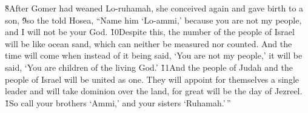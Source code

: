 \v{8}After Gomer had weaned Lo-ruhamah, she conceived again and gave birth to a son, \v{9}so the  told Hosea, ``Name him `Lo-ammi,' because you are not my people, and I will not be your God. \v{10}Despite this, the number of the people of Israel will be like ocean sand, which can neither be measured nor counted. And the time will come when instead of it being said, `You are not my people,' it will be said, `You are children of the living God.' \v{11}And the people of Judah and the people of Israel will be united as one. They will appoint for themselves a single leader and will take dominion over the land, for great will be the day of Jezreel.
\v{1}So call your brothers `Ammi,' and your sisters `Ruhamah.'\,''

